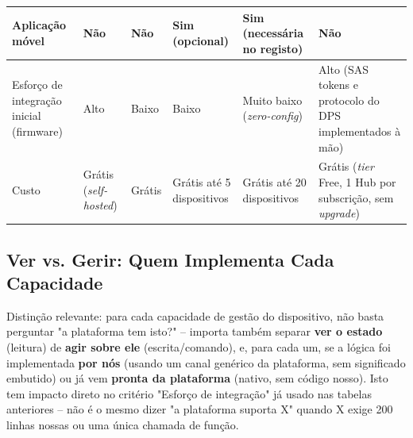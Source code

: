 \documentclass[a4paper,12pt]{article}
\begin{document}
\begin{center}
{\begin{tabular}{|l|l|l|l|l|l|}
\hline
Aplicação móvel & Não & Não & Sim (opcional) & Sim (necessária no registo) & Não \\
\hline
Esforço de integração inicial (firmware) & Alto & Baixo & Baixo & Muito baixo (\textit{zero-config}) & Alto (SAS tokens e protocolo do DPS implementados à mão) \\
\hline
Custo & Grátis (\textit{self-hosted}) & Grátis & Grátis até 5 dispositivos & Grátis até 20 dispositivos & Grátis (\textit{tier} Free, 1 Hub por subscrição, sem \textit{upgrade}) \\
\hline
\end{tabular}%
}
\end{center}

\subsection{Ver vs. Gerir: Quem Implementa Cada Capacidade}
Distinção relevante: para cada capacidade de gestão do dispositivo, não basta perguntar "a plataforma tem isto?" -- importa também separar \textbf{ver o estado} (leitura) de \textbf{agir sobre ele} (escrita/comando), e, para cada um, se a lógica foi implementada \textbf{por nós} (usando um canal genérico da plataforma, sem significado embutido) ou já vem \textbf{pronta da plataforma} (nativo, sem código nosso). Isto tem impacto direto no critério "Esforço de integração" já usado nas tabelas anteriores -- não é o mesmo dizer "a plataforma suporta X" quando X exige 200 linhas nossas ou uma única chamada de função.
\end{document}
